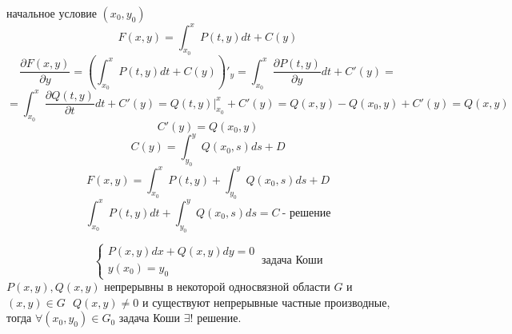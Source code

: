 \begin{block}
  начальное условие $(x_0, y_0)$
  $$
  F(x, y) = \int_{x_0}^x P(t, y)dt + C(y)
  $$
  $$
  \frac{\partial F(x, y)}{\partial y} =
  \left( \int_{x_0}^x P(t, y)dt + C(y) \right)'_y =
  \int_{x_0}^x \frac{\partial P(t, y)}{\partial y} dt + C'(y) =
  $$
  $$
  = \int_{x_0}^x \frac{\partial Q(t, y)}{\partial t} dt + C'(y) =
  Q(t, y)|_{x_0}^x + C'(y) = Q(x, y) - Q(x_0, y) + C'(y) = Q(x, y)
  $$
  $$
  C'(y) = Q(x_0, y)
  $$
  $$
  C(y) = \int_{y_0}^y Q(x_0, s) ds + D
  $$
  $$
  F(x, y) = \int_{x_0}^x P(t, y) + \int_{y_0}^y Q(x_0, s) ds + D
  $$
  $$
  \int_{x_0}^x P(t, y)dt + \int_{y_0}^y Q(x_0, s) ds = C ~ \text{- решение}
  $$
\end{block}

\begin{theorem}
  $$
  \left\{
  \begin{array}{l}
    P(x,y)dx + Q(x,y)dy = 0 \\
    y(x_0) = y_0
  \end{array}
  \right. ~ \text{задача Коши}
  $$
  $P(x, y), Q(x, y)$ непрерывны в некоторой односвязной области $G$ и
  $(x,y) \in G ~~~ Q(x, y) \not= 0$ и существуют непрерывные частные
  производные, тогда $\forall (x_0, y_0) \in G_0$ задача Коши
  $\exists !$ решение.
\end{theorem}

